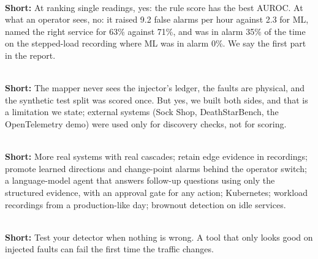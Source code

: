 \\
\textbf{Short:} At ranking single readings, yes: the rule score has the best AUROC. At what an operator sees, no: it raised 9.2 false alarms per hour against 2.3 for ML, named the right service for 63\% against 71\%, and was in alarm 35\% of the time on the stepped-load recording where ML was in alarm 0\%. We say the first part in the report.

\\
\textbf{Short:} The mapper never sees the injector's ledger, the faults are physical, and the synthetic test split was scored once. But yes, we built both sides, and that is a limitation we state; external systems (Sock Shop, DeathStarBench, the OpenTelemetry demo) were used only for discovery checks, not for scoring.

\\
\textbf{Short:} More real systems with real cascades; retain edge evidence in recordings; promote learned directions and change-point alarms behind the operator switch; a language-model agent that answers follow-up questions using only the structured evidence, with an approval gate for any action; Kubernetes; workload recordings from a production-like day; brownout detection on idle services.

\\
\textbf{Short:} Test your detector when nothing is wrong. A tool that only looks good on injected faults can fail the first time the traffic changes.
